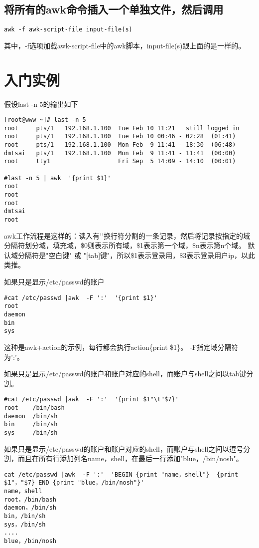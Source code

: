 \documentclass[12pt]{article}
\begin{document}
\subsection{将所有的awk命令插入一个单独文件，然后调用}
\begin{lstlisting} 
awk -f awk-script-file input-file(s)
\end{lstlisting}
其中，-f选项加载awk-script-file中的awk脚本，input-file(s)跟上面的是一样的。
 

\section{入门实例}
假设last -n 5的输出如下
\begin{lstlisting} 
[root@www ~]# last -n 5
root     pts/1   192.168.1.100  Tue Feb 10 11:21   still logged in
root     pts/1   192.168.1.100  Tue Feb 10 00:46 - 02:28  (01:41)
root     pts/1   192.168.1.100  Mon Feb  9 11:41 - 18:30  (06:48)
dmtsai   pts/1   192.168.1.100  Mon Feb  9 11:41 - 11:41  (00:00)
root     tty1                   Fri Sep  5 14:09 - 14:10  (00:01)

#last -n 5 | awk  '{print $1}'
root
root
root
dmtsai
root
\end{lstlisting}
awk工作流程是这样的：读入有'\n'换行符分割的一条记录，然后将记录按指定的域分隔符划分域，填充域，\$0则表示所有域，\$1表示第一个域，\$n表示第n个域。
默认域分隔符是"空白键" 或 "[tab]键"，所以\$1表示登录用，\$3表示登录用户ip，以此类推。


如果只是显示/etc/passwd的账户
\begin{lstlisting} 
#cat /etc/passwd |awk  -F ':'  '{print $1}'  
root
daemon
bin
sys
\end{lstlisting}
这种是awk+action的示例，每行都会执行action\{print \$1\}。
-F指定域分隔符为':'。
 

如果只是显示/etc/passwd的账户和账户对应的shell，而账户与shell之间以tab键分割。
\begin{lstlisting} 
#cat /etc/passwd |awk  -F ':'  '{print $1"\t"$7}'
root    /bin/bash
daemon  /bin/sh
bin     /bin/sh
sys     /bin/sh
\end{lstlisting}

如果只是显示/etc/passwd的账户和账户对应的shell，而账户与shell之间以逗号分割，而且在所有行添加列名name，shell，在最后一行添加"blue，/bin/nosh"。

\begin{lstlisting} 
cat /etc/passwd |awk  -F ':'  'BEGIN {print "name，shell"}  {print $1"，"$7} END {print "blue，/bin/nosh"}'
name，shell
root，/bin/bash
daemon，/bin/sh
bin，/bin/sh
sys，/bin/sh
....
blue，/bin/nosh
\end{lstlisting} 
\end{document}
